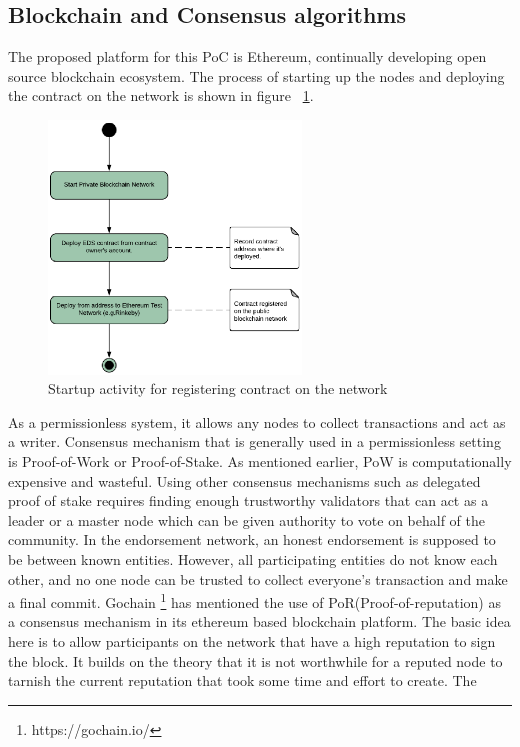 \subsection{Blockchain and Consensus algorithms}\label{subsec:bcConsensus}
The proposed platform for this PoC is Ethereum, continually developing open
source blockchain ecosystem. The process of starting up the nodes and deploying
the contract on the network is shown in figure ~\ref{fig:startup}. 
\begin{figure}
	\centering
	\includegraphics[width=0.6\textwidth]{Images/ActivityDiagramStartUpBC.eps}
	\caption{Startup activity for registering contract on the network}
	\label{fig:startup}
\end{figure}
As a permissionless system, it allows any nodes to collect transactions and act
as a writer. Consensus mechanism that is generally used in a permissionless
setting is Proof-of-Work or Proof-of-Stake. As mentioned earlier, PoW is
computationally expensive and wasteful. Using other consensus mechanisms such
as delegated proof of stake requires finding enough trustworthy validators that
can act as a leader or a master node which can be given authority to vote on
behalf of the community. In the endorsement network, an honest endorsement is
supposed to be between known entities. However, all participating entities do
not know each other, and no one node can be trusted to collect everyone's
transaction and make a final commit. Gochain \footnote{https://gochain.io/} has
mentioned the use of PoR(Proof-of-reputation) as a consensus mechanism in its
ethereum based blockchain platform. The basic idea here is to allow
participants on the network that have a high reputation to sign the block. It
builds on the theory that it is not worthwhile for a reputed node to tarnish
the current reputation that took some time and effort to create. The
